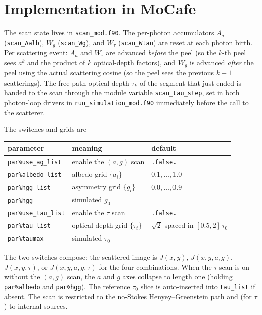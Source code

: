 \documentclass[english,a4paper]{kiseon_memo}
\begin{document}
\section{Implementation in MoCafe}

The scan state lives in \texttt{scan\_mod.f90}.  The per-photon accumulators
$A_a$ (\texttt{scan\_Aalb}), $W_g$ (\texttt{scan\_Wg}), and $W_\tau$
(\texttt{scan\_Wtau}) are reset at each photon birth.  Per scattering event:
$A_a$ and $W_\tau$ are advanced \emph{before} the peel (so the $k$-th peel sees
$a^k$ and the product of $k$ optical-depth factors), and $W_g$ is advanced
\emph{after} the peel using the actual scattering cosine (so the peel sees the
previous $k-1$ scatterings).  The free-path optical depth $\tau_k$ of the segment
that just ended is handed to the scan through the module variable
\texttt{scan\_tau\_step}, set in both photon-loop drivers in
\texttt{run\_simulation\_mod.f90} immediately before the call to the scatterer.

The switches and grids are
\begin{center}
\begin{tabular}{lll}
\hline
parameter & meaning & default \\
\hline
\texttt{par\%use\_ag\_list}  & enable the $(a,g)$ scan      & \texttt{.false.} \\
\texttt{par\%albedo\_list}   & albedo grid $\{a_i\}$        & $0.1,\dots,1.0$ \\
\texttt{par\%hgg\_list}      & asymmetry grid $\{g_l\}$     & $0.0,\dots,0.9$ \\
\texttt{par\%hgg}            & simulated $g_0$              & --- \\
\texttt{par\%use\_tau\_list} & enable the $\tau$ scan       & \texttt{.false.} \\
\texttt{par\%tau\_list}      & optical-depth grid $\{\tau_t\}$ & $\sqrt2$-spaced in $[0.5,2]\,\tau_0$ \\
\texttt{par\%taumax}         & simulated $\tau_0$           & --- \\
\hline
\end{tabular}
\end{center}
The two switches compose: the scattered image is $J(x,y)$, $J(x,y,a,g)$,
$J(x,y,\tau)$, or $J(x,y,a,g,\tau)$ for the four combinations.  When the $\tau$
scan is on without the $(a,g)$ scan, the $a$ and $g$ axes collapse to length one
(holding \texttt{par\%albedo} and \texttt{par\%hgg}).  The reference
$\tau_0$ slice is auto-inserted into \texttt{tau\_list} if absent.  The scan is
restricted to the no-Stokes Henyey--Greenstein path and (for $\tau$) to internal
sources.
\end{document}

